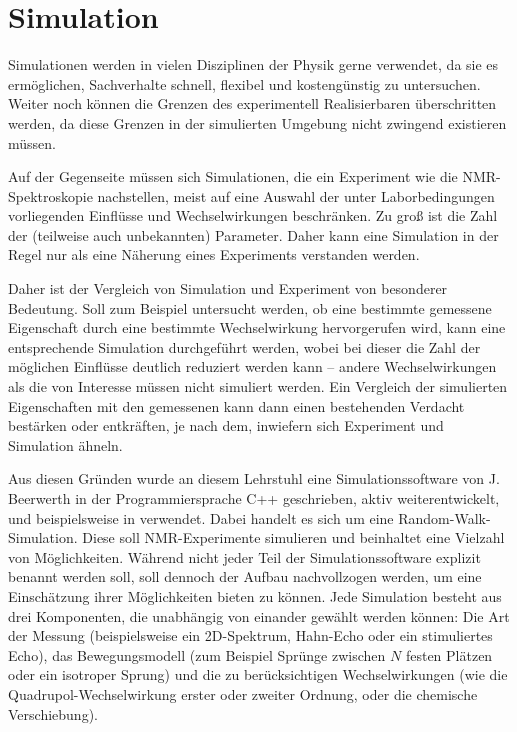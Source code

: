 \chapter{Simulation}\label{chapter:simulation}

Simulationen werden in vielen Disziplinen der Physik gerne verwendet, da sie es ermöglichen, Sachverhalte schnell, flexibel und kostengünstig zu untersuchen. Weiter noch können die Grenzen des experimentell Realisierbaren überschritten werden, da diese Grenzen in der simulierten Umgebung nicht zwingend existieren müssen.

Auf der Gegenseite müssen sich Simulationen, die ein Experiment wie die NMR-Spektroskopie nachstellen, meist auf eine Auswahl der unter Laborbedingungen vorliegenden Einflüsse und Wechselwirkungen beschränken. Zu groß ist die Zahl der (teilweise auch unbekannten) Parameter. Daher kann eine Simulation in der Regel nur als eine Näherung eines Experiments verstanden werden.

Daher ist der Vergleich von Simulation und Experiment von besonderer Bedeutung. Soll zum Beispiel untersucht werden, ob eine bestimmte gemessene Eigenschaft durch eine bestimmte Wechselwirkung hervorgerufen wird, kann eine entsprechende Simulation durchgeführt werden, wobei bei dieser die Zahl der möglichen Einflüsse deutlich reduziert werden kann -- andere Wechselwirkungen als die von Interesse müssen nicht simuliert werden. Ein Vergleich der simulierten Eigenschaften mit den gemessenen kann dann einen bestehenden Verdacht bestärken oder entkräften, je nach dem, inwiefern sich Experiment und Simulation ähneln.


Aus diesen Gründen wurde an diesem Lehrstuhl eine Simulationssoftware von J. Beerwerth in der Programmiersprache C++ geschrieben, aktiv weiterentwickelt, und beispielsweise in \cite{joachim_master} verwendet. Dabei handelt es sich um eine Random-Walk-Simulation. Diese soll NMR-Experimente simulieren und beinhaltet eine Vielzahl von Möglichkeiten. Während nicht jeder Teil der Simulationssoftware explizit benannt werden soll, soll dennoch der Aufbau nachvollzogen werden, um eine Einschätzung ihrer Möglichkeiten bieten zu können. Jede Simulation besteht aus drei Komponenten, die unabhängig von einander gewählt werden können: Die Art der Messung (beispielsweise ein 2D-Spektrum, Hahn-Echo oder ein stimuliertes Echo), das Bewegungsmodell (zum Beispiel Sprünge zwischen $N$ festen Plätzen oder ein isotroper Sprung) und die zu berücksichtigen Wechselwirkungen (wie die Quadrupol-Wechselwirkung erster oder zweiter Ordnung, oder die chemische Verschiebung).

